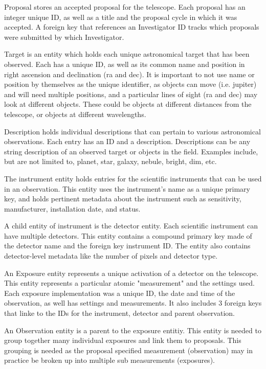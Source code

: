 \documentclass[a4paper,11pt]{article}
\begin{document}
Proposal stores an accepted proposal for the telescope.  Each proposal has an integer unique ID, as well as a title and the proposal cycle in which it was accepted.  A foreign key that references an Investigator ID tracks which proposals were submitted by which Investigator.  

Target is an entity which holds each unique astronomical target that has been observed.  Each has a unique ID, as well as its common name and position in right ascension and declination (ra and dec).  It is important to not use name or position by themselves as the unique identifier, as objects can move (i.e. jupiter) and will need multiple positions, and a particular lines of sight (ra and dec) may look at different objects.  These could be objects at different distances from the telescope, or objects at different wavelengths.  

Description holds individual descriptions that can pertain to various astronomical observations.  Each entry has an ID and a description.  Descriptions can be any string description of an observed target or objects in the field.  Examples include, but are not limited to, planet, star, galaxy, nebule, bright, dim, etc.

The instrument entity holds entries for the scientific instruments that can be used in an observation.  This entity uses the instrument's name as a unique primary key, and holds pertinent metadata about the instrument such as sensitivity, manufacturer, installation date, and status.  

A child entity of instrument is the detector entity.  Each scientific instrument can have multiple detectors.  This entity contains a compound primary key made of the detector name and the foreign key instrument ID.  The entity also contains detector-level metadata like the number of pixels and detector type.

An Exposure entity represents a unique activation of a detector on the telescope.  This entity represents a particular atomic "measurement" and the settings used.  Each exposure implementation was a unique ID, the date and time of the observation, as well has settings and measurements.  It also includes 3 foreign keys that linke to the IDs for the instrument, detector and parent observation.

An Observation entity is a parent to the exposure entitiy. This entity is needed to group together many individual exposures and link them to proposals.  This grouping is needed as the proposal specified measurement (observation) may in practice be broken up into multiple sub measurements (exposures).  
\end{document}
